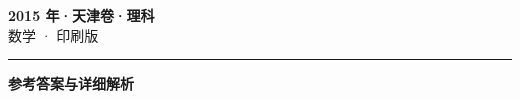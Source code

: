 \documentclass[zihao=5, a4paper]{ctexart}
\begin{document}
\begin{center}
  {\Large\bfseries 2015 年·天津卷·理科}\\[4pt]
  {\large 数学 · 印刷版}
\end{center}
\medskip
{}

\par\bigskip\hrule\bigskip
{}
\begin{center}{\large\bfseries 参考答案与详细解析}\end{center}
\smallskip

\end{document}
